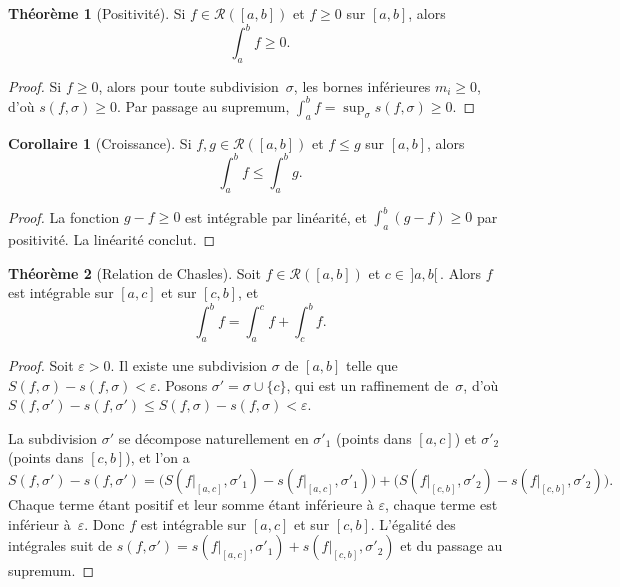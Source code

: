\documentclass[12pt,a4paper,openany]{book}
\theoremstyle{definition}
\newtheorem{theoreme}{Théorème}[chapter]
\newtheorem{corollaire}{Corollaire}[chapter]
\newcommand{\eps}{\varepsilon}
\begin{document}
\begin{theoreme}[Positivité]\label{thm:positivite}
  Si $f \in \mathcal{R}([a,b])$ et $f \geqslant 0$ sur $[a,b]$, alors
  \[
    \int_a^b f \geqslant 0.
  \]
\end{theoreme}

\begin{proof}
  Si $f \geqslant 0$, alors pour toute subdivision~$\sigma$, les bornes inférieures $m_i \geqslant 0$, d'où $s(f,\sigma) \geqslant 0$. Par passage au supremum, $\displaystyle\int_a^b f = \sup_\sigma s(f,\sigma) \geqslant 0$.
\end{proof}

\begin{corollaire}[Croissance]\label{cor:croissance}
  Si $f, g \in \mathcal{R}([a,b])$ et $f \leqslant g$ sur $[a,b]$, alors
  \[
    \int_a^b f \leqslant \int_a^b g.
  \]
\end{corollaire}

\begin{proof}
  La fonction $g - f \geqslant 0$ est intégrable par linéarité, et $\displaystyle\int_a^b (g - f) \geqslant 0$ par positivité. La linéarité conclut.
\end{proof}

\begin{theoreme}[Relation de Chasles]\label{thm:chasles}
  Soit $f \in \mathcal{R}([a,b])$ et $c \in \,]a,b[\,$. Alors $f$ est intégrable sur $[a,c]$ et sur $[c,b]$, et
  \[
    \int_a^b f = \int_a^c f + \int_c^b f.
  \]
\end{theoreme}

\begin{proof}
  Soit $\eps > 0$. Il existe une subdivision $\sigma$ de $[a,b]$ telle que $S(f,\sigma) - s(f,\sigma) < \eps$. Posons $\sigma' = \sigma \cup \{c\}$, qui est un raffinement de~$\sigma$, d'où $S(f,\sigma') - s(f,\sigma') \leqslant S(f,\sigma) - s(f,\sigma) < \eps$.

  La subdivision $\sigma'$ se décompose naturellement en $\sigma'_1$ (points dans $[a,c]$) et $\sigma'_2$ (points dans $[c,b]$), et l'on a
  \[
    S(f,\sigma') - s(f,\sigma') = \bigl(S(f|_{[a,c]}, \sigma'_1) - s(f|_{[a,c]}, \sigma'_1)\bigr) + \bigl(S(f|_{[c,b]}, \sigma'_2) - s(f|_{[c,b]}, \sigma'_2)\bigr).
  \]
  Chaque terme étant positif et leur somme étant inférieure à $\eps$, chaque terme est inférieur à~$\eps$. Donc $f$ est intégrable sur $[a,c]$ et sur $[c,b]$. L'égalité des intégrales suit de $s(f,\sigma') = s(f|_{[a,c]},\sigma'_1) + s(f|_{[c,b]},\sigma'_2)$ et du passage au supremum.
\end{proof}
\end{document}
